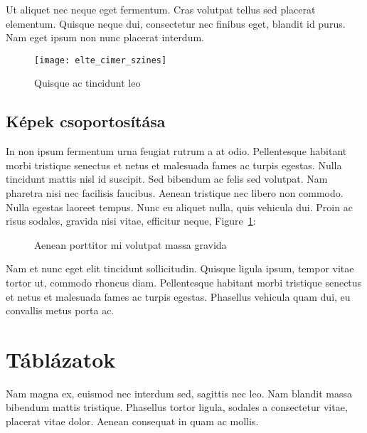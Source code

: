 Ut aliquet nec neque eget fermentum. Cras volutpat tellus sed placerat elementum. Quisque neque dui, consectetur nec finibus eget, blandit id purus. Nam eget ipsum non nunc placerat interdum.

\begin{figure}[H]
	\centering
	\texttt{[image: elte\_cimer\_szines]}
	\caption{Quisque ac tincidunt leo}
\end{figure}

\subsection{Képek csoportosítása}

In non ipsum fermentum urna feugiat rutrum a at odio. Pellentesque habitant morbi tristique senectus et netus et malesuada fames ac turpis egestas. Nulla tincidunt mattis nisl id suscipit. Sed bibendum ac felis sed volutpat. Nam pharetra nisi nec facilisis faucibus. Aenean tristique nec libero non commodo. Nulla egestas laoreet tempus. Nunc eu aliquet nulla, quis vehicula dui. Proin ac risus sodales, gravida nisi vitae, efficitur neque, Figure~\ref{fig:example-2}:

\begin{figure}[H]
	\centering
	\hspace{5pt}
	\caption{Aenean porttitor mi volutpat massa gravida}
	\label{fig:example-2}
\end{figure}

Nam et nunc eget elit tincidunt sollicitudin. Quisque ligula ipsum, tempor vitae tortor ut, commodo rhoncus diam. Pellentesque habitant morbi tristique senectus et netus et malesuada fames ac turpis egestas. Phasellus vehicula quam dui, eu convallis metus porta ac.


\section{Táblázatok}

Nam magna ex, euismod nec interdum sed, sagittis nec leo. Nam blandit massa bibendum mattis tristique. Phasellus tortor ligula, sodales a consectetur vitae, placerat vitae dolor. Aenean consequat in quam ac mollis.


